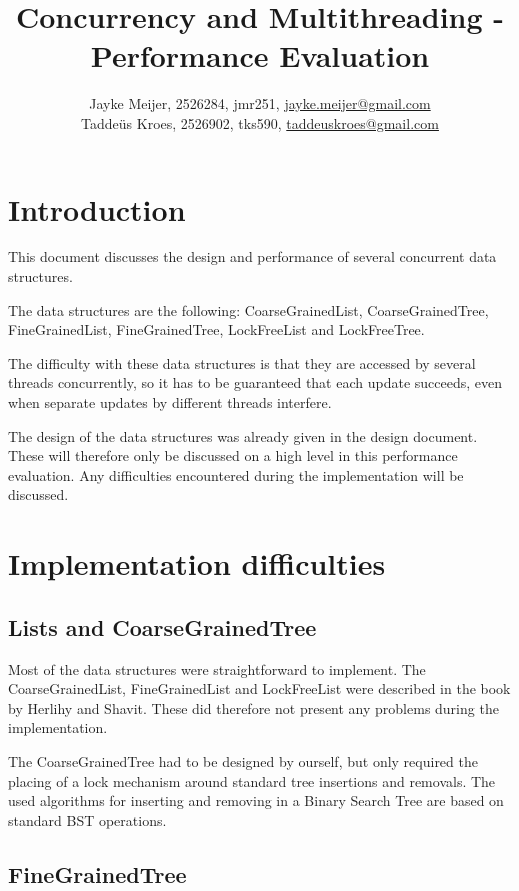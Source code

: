\documentclass[a4paper]{article}
\title{Concurrency and Multithreading - Performance Evaluation}
\author{Jayke Meijer, 2526284, jmr251, \url{jayke.meijer@gmail.com} \\
Taddeüs Kroes, 2526902, tks590, \url{taddeuskroes@gmail.com}}
\begin{document}
\maketitle

\tableofcontents
\pagebreak

\section{Introduction}

This document discusses the design and performance of several
concurrent data structures.

The data structures are the following: CoarseGrainedList,
CoarseGrainedTree, FineGrainedList, FineGrainedTree,
LockFreeList and LockFreeTree.

The difficulty with these data structures is that they are accessed by several threads
concurrently, so it has to be guaranteed that each update succeeds, even when separate
updates by different threads interfere.

The design of the data structures was already given in the design document\cite{design}.
These will therefore only be discussed on a high level in this performance evaluation. Any
difficulties encountered during the implementation will be discussed.

\section{Implementation difficulties}

\subsection{Lists and CoarseGrainedTree}
Most of the data structures were straightforward to implement. The CoarseGrainedList,
FineGrainedList and LockFreeList were described in the book by Herlihy and
Shavit\cite{book}. These did therefore not present any problems during the implementation.

The CoarseGrainedTree had to be designed by ourself, but only required the placing of a
lock mechanism around standard tree insertions and removals. The used algorithms for
inserting and removing in a Binary Search Tree are based on standard BST operations.
\cite{insert}\cite{delete}

\subsection{FineGrainedTree}
\end{document}
